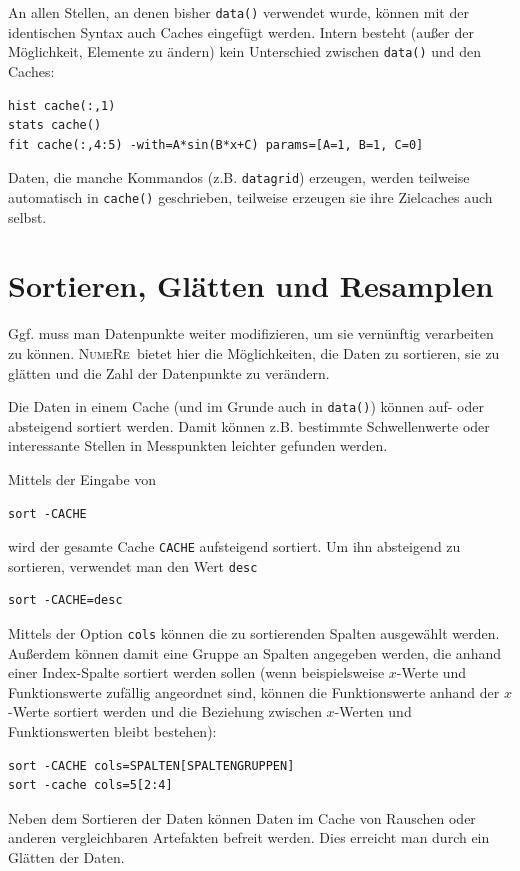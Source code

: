 \documentclass[DIV=14,headsepline,footsepline]{scrbook}
\newcommand{\NR}{\textsc{Nu\-me\-Re}}
\begin{document}
				An allen Stellen, an denen bisher \lstinline+data()+ verwendet wurde, können mit der identischen Syntax auch Caches eingefügt werden. Intern besteht (außer der Möglichkeit, Elemente zu ändern) kein Unterschied zwischen \lstinline+data()+ und den Caches:
				\begin{lstlisting}
hist cache(:,1)
stats cache()
fit cache(:,4:5) -with=A*sin(B*x+C) params=[A=1, B=1, C=0]
				\end{lstlisting}
				
				Daten, die manche Kommandos (z.B. \lstinline+datagrid+) erzeugen, werden teilweise automatisch in \lstinline+cache()+ geschrieben, teilweise erzeugen sie ihre Zielcaches auch selbst.
			\section{Sortieren, Glätten und Resamplen}
				Ggf. muss man Datenpunkte weiter modifizieren, um sie vernünftig verarbeiten zu können. \NR\ bietet hier die Möglichkeiten, die Daten zu sortieren, sie zu glätten und die Zahl der Datenpunkte zu verändern.
				
				Die Daten in einem Cache (und im Grunde auch in \lstinline+data()+) können auf- oder absteigend sortiert werden. Damit können z.B. bestimmte Schwellenwerte oder interessante Stellen in Messpunkten leichter gefunden werden.
				
				Mittels der Eingabe von
				\begin{lstlisting}
sort -CACHE
				\end{lstlisting}
				wird der gesamte Cache \lstinline+CACHE+ aufsteigend sortiert. Um ihn absteigend zu sortieren, verwendet man den Wert \lstinline+desc+
				\begin{lstlisting}
sort -CACHE=desc
				\end{lstlisting}
				Mittels der Option \lstinline+cols+ können die zu sortierenden Spalten ausgewählt werden. Außerdem können damit eine Gruppe an Spalten angegeben werden, die anhand einer Index-Spalte sortiert werden sollen (wenn beispielsweise $x$-Werte und Funktionswerte zufällig angeordnet sind, können die Funktionswerte anhand der $x$-Werte sortiert werden und die Beziehung zwischen $x$-Werten und Funktionswerten bleibt bestehen):
				\begin{lstlisting}
sort -CACHE cols=SPALTEN[SPALTENGRUPPEN]
sort -cache cols=5[2:4]
				\end{lstlisting}
				
				Neben dem Sortieren der Daten können Daten im Cache von Rauschen oder anderen vergleichbaren Artefakten befreit werden. Dies erreicht man durch ein Glätten der Daten.
				
\end{document}
